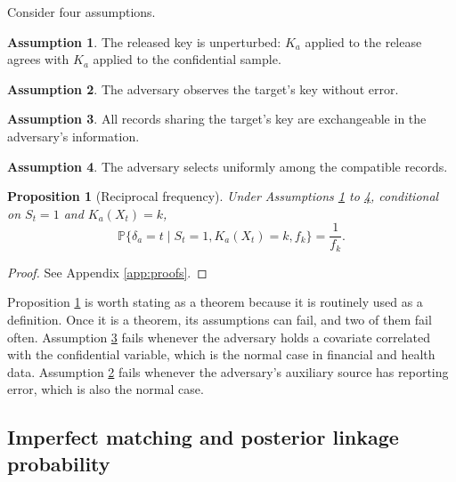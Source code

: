 \documentclass[11pt,a4paper]{article}
\theoremstyle{plain}
\newtheorem{proposition}{Proposition}
\theoremstyle{definition}
\newtheorem{assumption}{Assumption}
\newcommand{\Prob}{\mathbb{P}}
\begin{document}
Consider four assumptions.

\begin{assumption}\label{as:key}
The released key is unperturbed: $K_a$ applied to the release agrees with $K_a$
applied to the confidential sample.
\end{assumption}
\begin{assumption}\label{as:obs}
The adversary observes the target's key without error.
\end{assumption}
\begin{assumption}\label{as:exch}
All records sharing the target's key are exchangeable in the adversary's
information.
\end{assumption}
\begin{assumption}\label{as:unif}
The adversary selects uniformly among the compatible records.
\end{assumption}

\begin{proposition}[Reciprocal frequency]\label{prop:recip}
Under Assumptions \ref{as:key} to \ref{as:unif}, conditional on $S_t = 1$ and
$K_a(X_t) = k$,
\begin{equation}
\Prob\{\delta_a = t \mid S_t = 1, K_a(X_t) = k, f_k\} = \frac{1}{f_k} .
\label{eq:recip}
\end{equation}
\end{proposition}

\begin{proof}
See Appendix \ref{app:proofs}.
\end{proof}

Proposition \ref{prop:recip} is worth stating as a theorem because it is
routinely used as a definition. Once it is a theorem, its assumptions can fail,
and two of them fail often. Assumption \ref{as:exch} fails whenever the
adversary holds a covariate correlated with the confidential variable, which is
the normal case in financial and health data. Assumption \ref{as:obs} fails
whenever the adversary's auxiliary source has reporting error, which is also the
normal case.

\subsection{Imperfect matching and posterior linkage probability}
\end{document}
